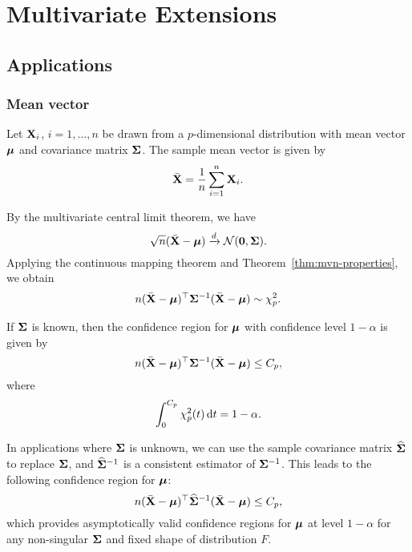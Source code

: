 \chapter{Multivariate Extensions}

\section{Applications}

\subsection{Mean vector}

Let ${\bf X}_{i}$, $i=1,\ldots,n$ be drawn from a $p$-dimensional distribution with mean vector $\boldsymbol{\mu}$ and covariance matrix $\boldsymbol{\Sigma}$. The sample mean vector is given by
\begin{equation*}
	\bar{{\bf X}}=\frac{1}{n}\sum_{i=1}^{n}{\bf X}_{i}.
\end{equation*}

By the multivariate central limit theorem, we have
\begin{equation*}
	\sqrt{n}(\bar{{\bf X}}-\boldsymbol{\mu})\xrightarrow{d}{\mathcal N}(\mathbf{0},\boldsymbol{\Sigma}).
\end{equation*}
Applying the continuous mapping theorem and Theorem~\ref{thm:mvn-properties}, we obtain
\begin{equation*}
	n(\bar{{\bf X}}-\boldsymbol{\mu})^{\top}\boldsymbol{\Sigma}^{-1}(\bar{{\bf X}}-\boldsymbol{\mu})\sim\chi^{2}_{p}.
\end{equation*}

If $\boldsymbol{\Sigma}$ is known, then the confidence region for $\boldsymbol{\mu}$ with confidence level $1-\alpha$ is given by
\begin{equation*}
	n(\bar{{\bf X}}-\boldsymbol{\mu})^{\top}\boldsymbol{\Sigma}^{-1}(\bar{{\bf X}}-\boldsymbol{\mu})\leq C_{p},
\end{equation*}
where
\begin{equation*}
	\int_{0}^{C_{p}}\chi^{2}_{p}(t)\mathop{}\!\mathrm{d} t=1-\alpha.
\end{equation*}

In applications where $\boldsymbol{\Sigma}$ is unknown, we can use the sample covariance matrix $\widehat{\boldsymbol{\Sigma}}$ to replace $\boldsymbol{\Sigma}$, and $\widehat{\boldsymbol{\Sigma}}^{-1}$ is a consistent estimator of $\boldsymbol{\Sigma}^{-1}$. This leads to the following confidence region for $\boldsymbol{\mu}$:
\begin{equation*}
	n(\bar{{\bf X}}-\boldsymbol{\mu})^{\top}\widehat{\boldsymbol{\Sigma}}^{-1}(\bar{{\bf X}}-\boldsymbol{\mu})\leq C_{p},
\end{equation*}
which provides asymptotically valid confidence regions for $\boldsymbol{\mu}$ at level $1-\alpha$ for any non-singular $\boldsymbol{\Sigma}$ and fixed shape of distribution $F$.

